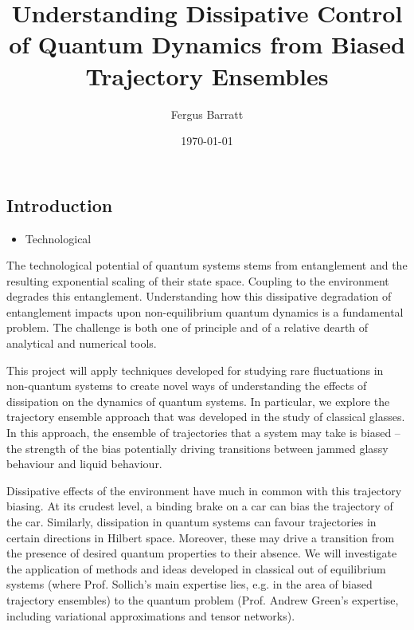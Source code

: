 \documentclass[final]{beamer}
\title
[CANES Retreat 2017] %
{ %
Understanding Dissipative Control of Quantum Dynamics from Biased Trajectory Ensembles
}
\author{ %
Fergus Barratt\inst{1}
}
\institute
[King's College London] %
{
\inst{1} King's College London
}
\date{\today}
\begin{document}
\begin{frame}[t]
\begin{multicols}{3}

\section{Introduction}

\begin{itemize}
    \item Technological 

\end{itemize}
The technological potential of quantum systems stems from entanglement and the resulting exponential scaling of their state space. Coupling to the environment degrades this entanglement. Understanding how this dissipative degradation of entanglement impacts upon non-equilibrium quantum dynamics is a fundamental problem. The challenge is both one of principle and of a relative dearth of analytical and numerical tools.

This project will apply techniques developed for studying rare fluctuations in non-quantum systems to create novel ways of understanding the effects of dissipation on the dynamics of quantum systems. In particular, we explore the trajectory ensemble approach that was developed in the study of classical glasses. In this approach, the ensemble of trajectories that a system may take is biased – the strength of the bias potentially driving transitions between jammed glassy behaviour and liquid behaviour.

Dissipative effects of the environment have much in common with this trajectory biasing. At its crudest level, a binding brake on a car can bias the trajectory of the car. Similarly, dissipation in quantum systems can favour trajectories in certain directions in Hilbert space. Moreover, these may drive a transition from the presence of desired quantum properties to their absence. We will investigate the application of methods and ideas developed in classical out of equilibrium systems (where Prof. Sollich’s main expertise lies, e.g. in the area of biased trajectory ensembles) to the quantum problem (Prof. Andrew Green’s expertise, including variational approximations and tensor networks).


\end{multicols}
\end{frame}
\end{document}
